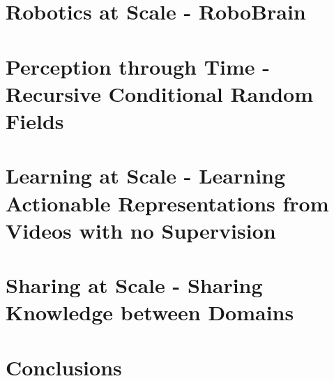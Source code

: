 \documentclass[phd,tocprelim]{cornell}
\begin{document}
\chapter{Robotics at Scale - RoboBrain}


\chapter{Perception through Time - Recursive Conditional Random Fields}
\label{rcrf}



\chapter{Learning at Scale - Learning Actionable Representations from Videos with no Supervision}
\label{repr}



\chapter{Sharing at Scale - Sharing Knowledge between Domains}
\label{repr2}




\chapter{Conclusions}
\label{conc}


%


\end{document}
